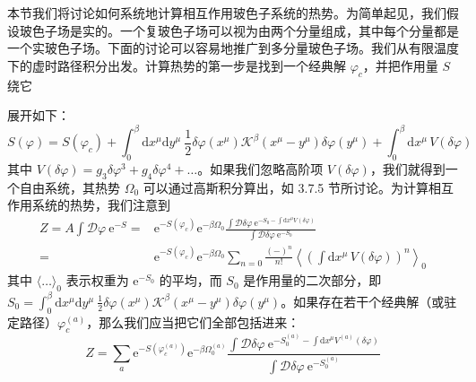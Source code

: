 本节我们将讨论如何系统地计算相互作用玻色子系统的热势。为简单起见，我们假设玻色子场是实的。一个复玻色子场可以视为由两个分量组成，其中每个分量都是一个实玻色子场。下面的讨论可以容易地推广到多分量玻色子场。我们从有限温度下的虚时路径积分出发。计算热势的第一步是找到一个经典解 $\varphi_{c}$，并把作用量 $S$ 绕它

展开如下：
\begin{equation*}
S(\varphi) = S(\varphi_{c}) + \int_{0}^{\beta}\mathrm{d}x^{\mu}\mathrm{d}y^{\mu}\ \frac{1}{2}\delta\varphi(x^{\mu})\mathcal{K}^{\beta}(x^{\mu}-y^{\mu})\delta\varphi(y^{\mu}) + \int_{0}^{\beta}\mathrm{d}x^{\mu}\,V(\delta\varphi)
\end{equation*}
其中 $V(\delta\varphi)=g_{3}\delta\varphi^{3}+g_{4}\delta\varphi^{4}+\dots$。如果我们忽略高阶项 $V(\delta\varphi)$，我们就得到一个自由系统，其热势 $\Omega_{0}$ 可以通过高斯积分算出，如 3.7.5 节所讨论。为计算相互作用系统的热势，我们注意到
\begin{align*}
Z = A\int\mathcal{D}\varphi\ \mathrm{e}^{-S} ={}& \mathrm{e}^{-S(\varphi_{c})}\mathrm{e}^{-\beta\Omega_{0}}\frac{\int\mathcal{D}\delta\varphi\ \mathrm{e}^{-S_{0}-\int \mathrm{d}x^{\mu}V(\delta\varphi)}}{\int\mathcal{D}\delta\varphi\ \mathrm{e}^{-S_{0}}}\\
={}& \mathrm{e}^{-S(\varphi_{c})}\mathrm{e}^{-\beta\Omega_{0}}\sum_{n=0}\frac{(-)^{n}}{n!}\left\langle\left(\int \mathrm{d}x^{\mu}\,V(\delta\varphi)\right)^{n}\right\rangle_{0}
\end{align*}
其中 $\langle\dots\rangle_{0}$ 表示权重为 $\mathrm{e}^{-S_{0}}$ 的平均，而 $S_{0}$ 是作用量的二次部分，即 $S_{0}\allowbreak=\int_{0}^{\beta}\mathrm{d}x^{\mu}\mathrm{d}y^{\mu}\allowbreak\ \frac{1}{2}\delta\varphi(x^{\mu})\mathcal{K}^{\beta}(x^{\mu}-y^{\mu})\delta\varphi(y^{\mu})$。如果存在若干个经典解（或驻定路径）$\varphi_{c}^{(a)}$，那么我们应当把它们全部包括进来：
\begin{equation*}
Z = \sum_{a}\mathrm{e}^{-S(\varphi_{c}^{(a)})}\mathrm{e}^{-\beta\Omega_{0}^{(a)}}\frac{\int\mathcal{D}\delta\varphi\ \mathrm{e}^{-S_{0}^{(a)}-\int \mathrm{d}x^{\mu}V^{(a)}(\delta\varphi)}}{\int\mathcal{D}\delta\varphi\ \mathrm{e}^{-S_{0}^{(a)}}}
\end{equation*}

